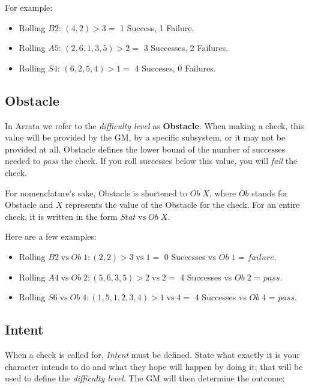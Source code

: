 \documentclass[../main.tex]{subfiles}
\begin{document}
    For example:

    \begin{itemize}
        \item Rolling $B2$: $(4, 2)>3 =$ 1 Success, 1 Failure.
        \item Rolling $A5$: $(2, 6, 1, 3, 5)>2 =$ 3 Successes, 2 Failures.
        \item Rolling $S4$: $(6, 2, 5, 4)>1 =$ 4 Succeses, 0 Failures.
    \end{itemize}

    \subsection{Obstacle}

    In Arrata we refer to the {\em difficulty level} as \textbf{Obstacle}. When making a check, this value will be provided by the GM, by a specific subsystem, or it may not be provided at all. Obstacle defines the lower bound of the number of successes needed to {\em pass} the check. If you roll successes below this value, you will {\em fail} the check.

    For nomenclature's sake, Obstacle is shortened to $Ob\; X$, where $Ob$ stands for Obstacle and $X$ represents the value of the Obstacle for the check. For an entire check, it is written in the form $Stat\mathrm{\; vs \;}Ob\; X$.

    Here are a few examples:

    \begin{itemize}
        \item Rolling $B2\mathrm{\; vs \;}Ob\; 1: (2, 2)>3\mathrm{\; vs \;}1 =$ 0 Successes vs $Ob\; 1$ = $failure$.
        \item Rolling $A4\mathrm{\; vs \;}Ob\; 2: (5, 6, 3, 5)>2\mathrm{\; vs \;}2 =$ 4 Successes vs $Ob\; 2$ = $pass$.
        \item Rolling $S6\mathrm{\; vs \;}Ob\; 4: (1, 5, 1, 2, 3, 4)>1\mathrm{\; vs \;}4 =$ 4 Successes vs $Ob\; 4$ = $pass$.
    \end{itemize}

    \subsection{Intent}

    When a check is called for, {\em Intent} must be defined. State what exactly it is your character intends to do and what they hope will happen by doing it; that will be used to define the {\em difficulty level}. The GM will then determine the outcome:
\end{document}
